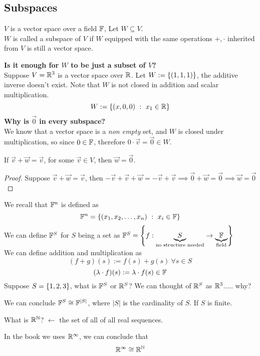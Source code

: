 \subsection{Subspaces}
\begin{definition}
    $V$ is a vector space over a field $\mathbb F$, Let $W \subseteq V$. \\
    $W$ is called a subspace of $V$ if $W$ equipped with the same operations $+, \cdot$ inherited from $V$ is still a vector space.
\end{definition}
\textbf{Is it enough for $W$ to be just a subset of $V$?} \\
Suppose $V = \mathbb R^3$ is a vector space over $\mathbb R$. Let $W := \left\{ (1,1,1) \right\}$, the additive inverse doesn't exist. Note that $W$ is not closed in addition and scalar multiplication. \\
\[W := \left\{ (x,0,0) \ : \ x_1 \in \mathbb R \right\}\]
\textbf{Why is $\vec 0$ in every subspace?} \\
We know that a vector space is a \textit{non empty} set, and $W$ is closed under multiplication, so since $0 \in \mathbb F$, therefore $0 \cdot \vec v = \vec 0 \in W$. 
\begin{remark}
If $\vec v + \vec w = \vec v$, for some $\vec v \in V$, then $\vec w = \vec 0$.
\end{remark}
\begin{proof}
    Suppose $\vec v + \vec w = \vec v$, then $- \vec v + \vec v  +\vec w = - \vec v + \vec v \implies \vec 0 + \vec w = \vec 0 \implies \vec w = \vec 0$
\end{proof}
We recall that $\mathbb F^n$ is defined as 
\[\mathbb F^n = \left\{ ({x}_1,{x}_2, \ldots, {x}_{n})\ : \ x_i \in \mathbb F \right\} \]
We can define $\mathbb F^S$ for $S$ being a set as $\mathbb F^{S} = \left\{ f :  \underbrace{S}_{\text{no structure needed}} \to \underbrace{\mathbb F}_{\text{field}} \right\} $ \\
We can define addition and multiplication as
\[ (f + g)(s) := f(s) + g(s) \ \forall s \in S \]
\[ (\lambda \cdot f)(s) := \lambda \cdot f(s) \in \mathbb F\]
Suppose $S = \left\{ 1,2,3 \right\}$, what is $\mathbb F^S$ or $\mathbb R^S$?
We can thought of $\mathbb R^S$ as $\mathbb R^3$..... why?
\begin{remark}
    We can conclude $\mathbb F^S \cong \mathbb F^{|S|}$, where $|S|$ is the cardinality of $S$. If $S$ is finite.
\end{remark}
What is $\mathbb R^{\mathbb N}$? $\leftarrow$ the set of all of all real sequences.
\begin{remark}
    In the book we uses $\mathbb R^\infty$, we can conclude that \[ \mathbb R^\infty \cong \mathbb R^{\mathbb N} \]
\end{remark}
